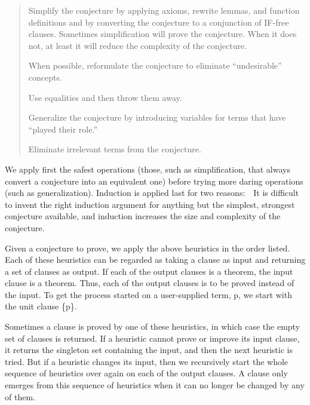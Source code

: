 \documentclass[10pt]{book}
\newenvironment{pubcrown}{\begin{quote}}{\end{quote}}
\begin{document}
\begin{pubcrown}
Simplify the conjecture by applying axioms, rewrite lemmas, and
function definitions and by converting the conjecture to a
conjunction of IF-free clauses.  Sometimes simplification will prove
the conjecture.  When it does not, at least it will reduce
the complexity of the conjecture.

When possible, reformulate the conjecture to eliminate ``undesirable''
concepts.

Use equalities and then throw them away.

Generalize the conjecture by introducing variables for terms that
have ``played their role.''

Eliminate irrelevant terms from the conjecture.
\end{pubcrown}
We apply first the safest operations (those, such as simplification,
that always convert a conjecture into an equivalent one)
before trying more daring operations  (such as generalization).
Induction is  applied last for two reasons:~~It is difficult
to invent the right induction argument for anything but the
simplest, strongest conjecture available, and induction 
increases the size and complexity of the conjecture.

Given a conjecture to prove,
we apply the above heuristics in the order listed.  Each of these heuristics can be
regarded as taking a clause as input and returning a set of clauses as
output.  If each of the output clauses is a theorem, the input clause is a theorem.  Thus,
each of the output clauses is  to  be proved instead of the input.  To get the process
started on a user-supplied term, p, we start with the unit clause
\{p\}.

Sometimes a clause is proved by one of these heuristics,
in which case the empty set of clauses is returned.  If a heuristic
cannot prove or improve its input clause, it
returns the singleton set containing
the input, and then the next heuristic is tried.  But if a heuristic changes
its input, then we recursively start the whole sequence of heuristics
over again on each of the output clauses.
A clause only emerges from this sequence of heuristics when it
can no longer be changed by any of them.
\end{document}
